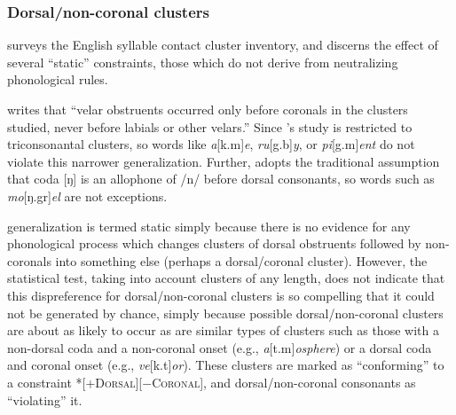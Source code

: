 
\subsubsection{Dorsal/non-coronal clusters}

\citet{Pierrehumbert1994} surveys the English syllable contact cluster inventory, and discerns the effect of several ``static'' constraints, those which do not derive from neutralizing phonological rules. 

\citet[][173]{Pierrehumbert1994} writes that ``velar obstruents occurred only before coronals in the clusters studied, never before labials or other velars.'' Since \citeauthor{Pierrehumbert1994}'s study is restricted to triconsonantal clusters, so words like \emph{a}[k.m]\emph{e}, \emph{ru}[g.b]\emph{y}, or \emph{pi}[g.m]\emph{ent} do not violate this narrower generalization. Further, \citeauthor{Pierrehumbert1994} adopts the traditional assumption \citep[e.g.,][66f.]{Borowsky1986} that coda [ŋ] is an allophone of /n/ before dorsal consonants, so words such as \emph{mo}[ŋ.gr]\emph{el} are not exceptions. 

\citeauthor{Pierrehumbert1994} generalization is termed static simply because there is no evidence for any phonological process which changes clusters of dorsal obstruents followed by non-coronals into something else (perhaps a dorsal/coronal cluster). However, the statistical test, taking into account clusters of any length, does not indicate that this dispreference for dorsal/non-coronal clusters is so compelling that it could not be generated by chance, simply because possible dorsal/non-coronal clusters are about as likely to occur as are similar types of clusters such as those with a non-dorsal coda and a non-coronal onset (e.g., \emph{a}[t.m]\emph{osphere}) or a dorsal coda and coronal onset (e.g., \emph{ve}[k.t]\emph{or}). These clusters are marked as ``conforming'' to a constraint \textsc{*[+Dorsal][$-$Coronal]}, and dorsal/non-coronal consonants as ``violating'' it. 

